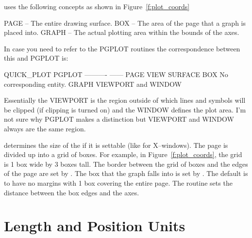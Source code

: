 \quickplot uses the following concepts as shown in Figure~\ref{f:plot_coords}
\begin{example}
  PAGE  -- The entire drawing surface.
  BOX   -- The area of the page that a graph is placed into.
  GRAPH -- The actual plotting area within the bounds of the axes.
\end{example}
In case you need to refer to the PGPLOT routines the correspondence between this and PGPLOT is:
\begin{example}
  QUICK_PLOT    PGPLOT
  ----------    ------
  PAGE          VIEW SURFACE
  BOX           No corresponding entity.
  GRAPH         VIEWPORT and WINDOW
\end{example}
Essentially the VIEWPORT is the region outside of which lines and symbols
will be clipped (if clipping is turned on) and the WINDOW defines the
plot area. I'm not sure why PGPLOT makes a distinction but VIEWPORT and
WINDOW always are the same region.

 determines the size of the  if it is settable (like for
X--windows). The page is divided up into a grid of boxes. For example, 
in Figure~\ref{f:plot_coords}, the grid is 1 box wide by 3 boxes tall. The border
between the grid of boxes and the edges of the page are set by .
The box that the graph falls into is set by . The default is to
have no margins with 1 box covering the entire page. The  routine
sets the distance between the box edges and the axes.


\section{Length and Position Units}
\label{s:plot_units}

